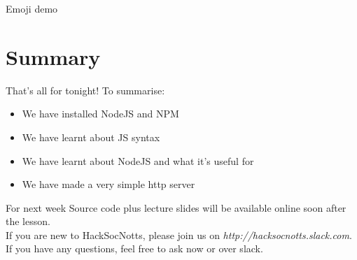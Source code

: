 \documentclass{beamer}
\begin{document}
\begin{frame}{Emoji demo}

\end{frame}

\section{Summary}

\begin{frame}{That's all for tonight!}
  To summarise:
  \begin{itemize}
  \item We have installed NodeJS and NPM
  \item We have learnt about JS syntax
  \item We have learnt about NodeJS and what it's useful for
  \item We have made a very simple http server
  \end{itemize}
\end{frame}

\begin{frame}{For next week}
Source code plus lecture slides will be available online soon after the lesson.\\
If you are new to HackSocNotts, please join us on \textit{http://hacksocnotts.slack.com}.\\
If you have any questions, feel free to ask now or over slack.\\
\end{frame}
\end{document}
